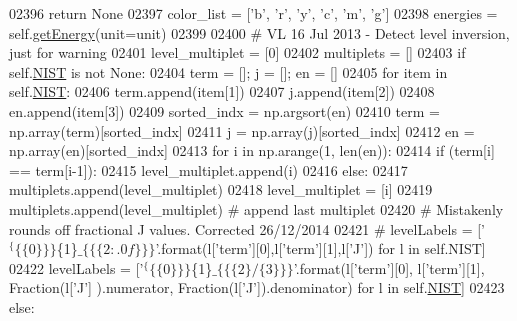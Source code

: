 \begin{DoxyCode}
02396             \textcolor{keywordflow}{return} \textcolor{keywordtype}{None}
02397         color\_list = [\textcolor{stringliteral}{'b'}, \textcolor{stringliteral}{'}\textcolor{stringliteral}{r', '}y', 'c', 'm', 'g']
02398         energies = self.\hyperlink{classpyneb_1_1core_1_1pynebcore_1_1_atom_a9940acb2999e864edf9761d822e65d7f}{getEnergy}(unit=unit)
02399          
02400         \textcolor{comment}{# VL 16 Jul 2013 - Detect level inversion, just for warning        }
02401         level\_multiplet = [0]
02402         multiplets = []
02403         \textcolor{keywordflow}{if} self.\hyperlink{classpyneb_1_1core_1_1pynebcore_1_1_atom_a65e03e79fb1cde1b00580042f3303538}{NIST} \textcolor{keywordflow}{is} \textcolor{keywordflow}{not} \textcolor{keywordtype}{None}:
02404             term = []; j = []; en = []
02405             \textcolor{keywordflow}{for} item \textcolor{keywordflow}{in} self.\hyperlink{classpyneb_1_1core_1_1pynebcore_1_1_atom_a65e03e79fb1cde1b00580042f3303538}{NIST}:
02406                 term.append(item[1])
02407                 j.append(item[2])
02408                 en.append(item[3])
02409             sorted\_indx = np.argsort(en) 
02410             term = np.array(term)[sorted\_indx]
02411             j = np.array(j)[sorted\_indx]
02412             en = np.array(en)[sorted\_indx]
02413             \textcolor{keywordflow}{for} i \textcolor{keywordflow}{in} np.arange(1, len(en)):
02414                 \textcolor{keywordflow}{if} (term[i] == term[i-1]):
02415                     level\_multiplet.append(i)
02416                 \textcolor{keywordflow}{else}:
02417                     multiplets.append(level\_multiplet) 
02418                     level\_multiplet = [i]
02419             multiplets.append(level\_multiplet) \textcolor{comment}{# append last multiplet}
02420 \textcolor{comment}{# Mistakenly rounds off fractional J values. Corrected 26/12/2014            }
02421 \textcolor{comment}{#            levelLabels = ['$^\{\{\{0\}\}\}$\{1\}$\_\{\{\{2:.0f\}\}\}$'.format(l['term'][0],l['term'][1],l['J']) for l in
       self.NIST]}
02422             levelLabels = [\textcolor{stringliteral}{'$^\{\{\{0\}\}\}$\{1\}$\_\{\{\{2\}/\{3\}\}\}$'}.format(l[\textcolor{stringliteral}{'term'}][0], l[\textcolor{stringliteral}{'term'}][1], Fraction(l[\textcolor{stringliteral}{'J'}]
      ).numerator, Fraction(l[\textcolor{stringliteral}{'J'}]).denominator) \textcolor{keywordflow}{for} l \textcolor{keywordflow}{in} self.\hyperlink{classpyneb_1_1core_1_1pynebcore_1_1_atom_a65e03e79fb1cde1b00580042f3303538}{NIST}]
02423         \textcolor{keywordflow}{else}:

\end{DoxyCode}
